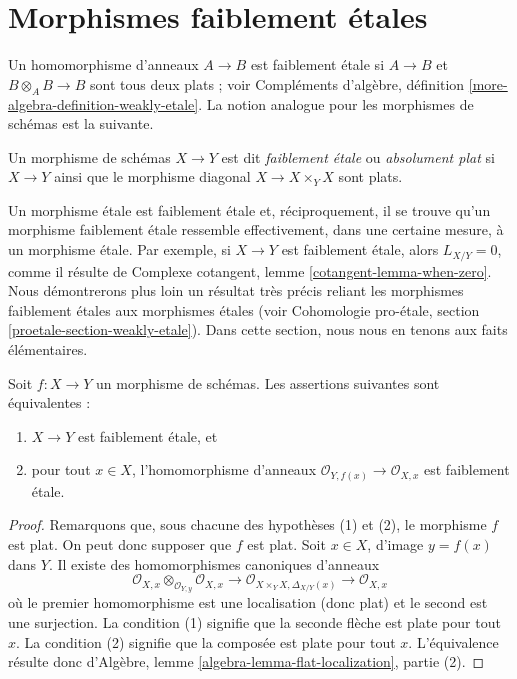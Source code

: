 \section{Morphismes faiblement \'etales}
\label{section-weakly-etale}

\noindent
Un homomorphisme d'anneaux $A \to B$ est faiblement \'etale si $A \to B$ et
$B \otimes_A B \to B$ sont tous deux plats ; voir
Compléments d'algèbre, définition \ref{more-algebra-definition-weakly-etale}.
La notion analogue pour les morphismes de schémas est la suivante.

\begin{definition}
\label{definition-weakly-etale}
Un morphisme de schémas $X \to Y$ est dit {\it faiblement \'etale} ou
{\it absolument plat} si $X \to Y$ ainsi que le morphisme diagonal
$X \to X \times_Y X$ sont plats.
\end{definition}

\noindent
Un morphisme \'etale est faiblement \'etale et, réciproquement,
il se trouve qu'un morphisme faiblement \'etale ressemble effectivement, dans une certaine mesure,
à un morphisme \'etale. Par exemple, si $X \to Y$ est faiblement
\'etale, alors $L_{X/Y} = 0$, comme il résulte de
Complexe cotangent, lemme \ref{cotangent-lemma-when-zero}.
Nous démontrerons plus loin un résultat très précis reliant les morphismes faiblement \'etales
aux morphismes \'etales (voir
Cohomologie pro-\'etale, section \ref{proetale-section-weakly-etale}).
Dans cette section, nous nous en tenons aux faits élémentaires.

\begin{lemma}
\label{lemma-check-weakly-etale-stalks}
Soit $f : X \to Y$ un morphisme de schémas. Les assertions suivantes sont équivalentes :
\begin{enumerate}
\item $X \to Y$ est faiblement \'etale, et
\item pour tout $x \in X$, l'homomorphisme d'anneaux
$\mathcal{O}_{Y, f(x)} \to \mathcal{O}_{X, x}$ est faiblement \'etale.
\end{enumerate}
\end{lemma}

\begin{proof}
Remarquons que, sous chacune des hypothèses (1) et (2), le morphisme $f$ est plat.
On peut donc supposer que $f$ est plat. Soit $x \in X$, d'image $y = f(x)$ dans $Y$.
Il existe des homomorphismes canoniques d'anneaux
$$
\mathcal{O}_{X, x} \otimes_{\mathcal{O}_{Y, y}} \mathcal{O}_{X, x}
\longrightarrow
\mathcal{O}_{X \times_Y X, \Delta_{X/Y}(x)}
\longrightarrow
\mathcal{O}_{X, x}
$$
où le premier homomorphisme est une localisation (donc plat) et le second est une
surjection. La condition (1) signifie que la seconde flèche est plate pour tout $x$.
La condition (2) signifie que la composée est plate pour tout $x$. L'équivalence résulte donc
d'Algèbre, lemme \ref{algebra-lemma-flat-localization}, partie (2).
\end{proof}

